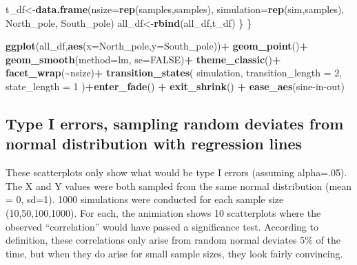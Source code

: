 \documentclass[
]{book}
\newenvironment{Shaded}{\begin{snugshade}}{\end{snugshade}}
\newcommand{\AttributeTok}[1]{\textcolor[rgb]{0.13,0.29,0.53}{#1}}
\newcommand{\ConstantTok}[1]{\textcolor[rgb]{0.56,0.35,0.01}{#1}}
\newcommand{\DecValTok}[1]{\textcolor[rgb]{0.00,0.00,0.81}{#1}}
\newcommand{\FunctionTok}[1]{\textcolor[rgb]{0.13,0.29,0.53}{\textbf{#1}}}
\newcommand{\NormalTok}[1]{#1}
\newcommand{\OtherTok}[1]{\textcolor[rgb]{0.56,0.35,0.01}{#1}}
\newcommand{\SpecialCharTok}[1]{\textcolor[rgb]{0.81,0.36,0.00}{\textbf{#1}}}
\newcommand{\StringTok}[1]{\textcolor[rgb]{0.31,0.60,0.02}{#1}}
\begin{document}
\begin{Shaded}
\begin{Highlighting}[]
\NormalTok{    t\_df}\OtherTok{\textless{}{-}}\FunctionTok{data.frame}\NormalTok{(}\AttributeTok{nsize=}\FunctionTok{rep}\NormalTok{(samples,samples),}
                   \AttributeTok{simulation=}\FunctionTok{rep}\NormalTok{(sim,samples),}
\NormalTok{                                  North\_pole,}
\NormalTok{                                  South\_pole)}
\NormalTok{  all\_df}\OtherTok{\textless{}{-}}\FunctionTok{rbind}\NormalTok{(all\_df,t\_df)}
\NormalTok{  \}}
\NormalTok{\}}

\FunctionTok{ggplot}\NormalTok{(all\_df,}\FunctionTok{aes}\NormalTok{(}\AttributeTok{x=}\NormalTok{North\_pole,}\AttributeTok{y=}\NormalTok{South\_pole))}\SpecialCharTok{+}
  \FunctionTok{geom\_point}\NormalTok{()}\SpecialCharTok{+}
  \FunctionTok{geom\_smooth}\NormalTok{(}\AttributeTok{method=}\NormalTok{lm, }\AttributeTok{se=}\ConstantTok{FALSE}\NormalTok{)}\SpecialCharTok{+}
  \FunctionTok{theme\_classic}\NormalTok{()}\SpecialCharTok{+}
  \FunctionTok{facet\_wrap}\NormalTok{(}\SpecialCharTok{\textasciitilde{}}\NormalTok{nsize)}\SpecialCharTok{+}
  \FunctionTok{transition\_states}\NormalTok{(}
\NormalTok{    simulation,}
    \AttributeTok{transition\_length =} \DecValTok{2}\NormalTok{,}
    \AttributeTok{state\_length =} \DecValTok{1}
\NormalTok{  )}\SpecialCharTok{+}\FunctionTok{enter\_fade}\NormalTok{() }\SpecialCharTok{+} 
  \FunctionTok{exit\_shrink}\NormalTok{() }\SpecialCharTok{+}
  \FunctionTok{ease\_aes}\NormalTok{(}\StringTok{\textquotesingle{}sine{-}in{-}out\textquotesingle{}}\NormalTok{)}
\end{Highlighting}
\end{Shaded}

\subsection{Type I errors, sampling random deviates from normal distribution with regression lines}\label{type-i-errors-sampling-random-deviates-from-normal-distribution-with-regression-lines}

These scatterplots only show what would be type I errors (assuming alpha=.05). The X and Y values were both sampled from the same normal distribution (mean = 0, sd=1). 1000 simulations were conducted for each sample size (10,50,100,1000). For each, the animiation shows 10 scatterplots where the observed ``correlation'' would have passed a significance test. According to definition, these correlations only arise from random normal deviates 5\% of the time, but when they do arise for small sample sizes, they look fairly convincing.
\end{document}
